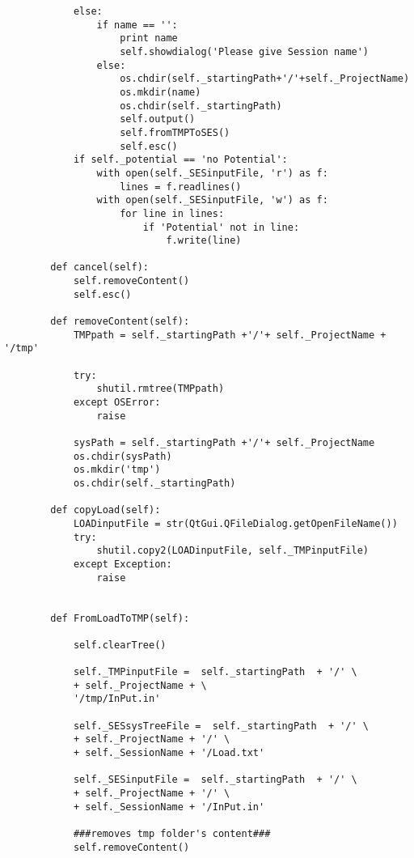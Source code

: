 \begin{verbatim}
            else:
                if name == '':
                    print name
                    self.showdialog('Please give Session name')
                else:
                    os.chdir(self._startingPath+'/'+self._ProjectName)
                    os.mkdir(name)
                    os.chdir(self._startingPath)
                    self.output()
                    self.fromTMPToSES()
                    self.esc()
            if self._potential == 'no Potential':
                with open(self._SESinputFile, 'r') as f:
                    lines = f.readlines()
                with open(self._SESinputFile, 'w') as f:
                    for line in lines:
                        if 'Potential' not in line:
                            f.write(line)
                
        def cancel(self):
            self.removeContent()
            self.esc()
    
        def removeContent(self):
            TMPpath = self._startingPath +'/'+ self._ProjectName + '/tmp'
    
            try:
                shutil.rmtree(TMPpath)
            except OSError:
                raise
                
            sysPath = self._startingPath +'/'+ self._ProjectName
            os.chdir(sysPath)
            os.mkdir('tmp')
            os.chdir(self._startingPath)
    
        def copyLoad(self):
            LOADinputFile = str(QtGui.QFileDialog.getOpenFileName())
            try:
                shutil.copy2(LOADinputFile, self._TMPinputFile)
            except Exception:
                raise
    
    
        def FromLoadToTMP(self):
            
            self.clearTree()
            
            self._TMPinputFile =  self._startingPath  + '/' \
            + self._ProjectName + \
            '/tmp/InPut.in'
            
            self._SESsysTreeFile =  self._startingPath  + '/' \
            + self._ProjectName + '/' \
            + self._SessionName + '/Load.txt'
    
            self._SESinputFile =  self._startingPath  + '/' \
            + self._ProjectName + '/' \
            + self._SessionName + '/InPut.in'
    
            ###removes tmp folder's content###
            self.removeContent()
    

\end{verbatim}
